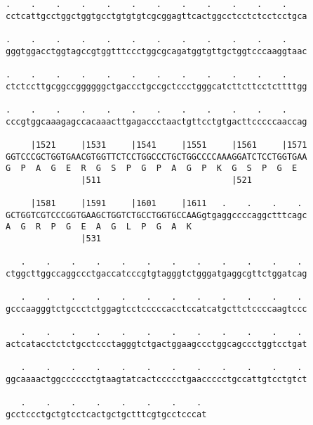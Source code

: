 \documentclass{article}
\begin{document}
\begin{Verbatim}
.    .    .    .    .    .    .    .    .    .    .    .    
cctcattgcctggctggtgcctgtgtgtcgcggagttcactggcctcctctcctcctgca
                                                            
.    .    .    .    .    .    .    .    .    .    .    .    
gggtggacctggtagccgtggtttccctggcgcagatggtgttgctggtcccaaggtaac
                                                            
.    .    .    .    .    .    .    .    .    .    .    .    
ctctccttgcggccggggggctgaccctgccgctccctgggcatcttcttcctcttttgg
                                                            
.    .    .    .    .    .    .    .    .    .    .    .    
cccgtggcaaagagccacaaacttgagaccctaactgttcctgtgacttcccccaaccag
                                                            
     |1521     |1531     |1541     |1551     |1561     |1571
GGTCCCGCTGGTGAACGTGGTTCTCCTGGCCCTGCTGGCCCCAAAGGATCTCCTGGTGAA
G  P  A  G  E  R  G  S  P  G  P  A  G  P  K  G  S  P  G  E  
               |511                          |521           
  
     |1581     |1591     |1601     |1611   .    .    .    . 
GCTGGTCGTCCCGGTGAAGCTGGTCTGCCTGGTGCCAAGgtgaggccccaggctttcagc
A  G  R  P  G  E  A  G  L  P  G  A  K                       
               |531                                         
  
   .    .    .    .    .    .    .    .    .    .    .    . 
ctggcttggccaggccctgaccatcccgtgtagggtctgggatgaggcgttctggatcag
                                                            
   .    .    .    .    .    .    .    .    .    .    .    . 
gcccaagggtctgccctctggagtcctcccccacctccatcatgcttctccccaagtccc
                                                            
   .    .    .    .    .    .    .    .    .    .    .    . 
actcatacctctctgcctccctagggtctgactggaagccctggcagccctggtcctgat
                                                            
   .    .    .    .    .    .    .    .    .    .    .    . 
ggcaaaactggcccccctgtaagtatcactccccctgaaccccctgccattgtcctgtct
                                                            
   .    .    .    .    .    .    .    . 
gcctccctgctgtcctcactgctgctttcgtgcctcccat
                                        
                                        
 

\end{Verbatim}
\end{document}
